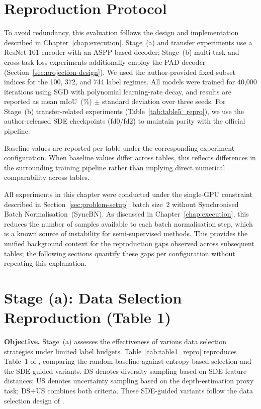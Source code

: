 \section{Reproduction Protocol}
\label{sec:repro_protocol}

\noindent
To avoid redundancy, this evaluation follows the design and implementation
described in Chapter~\ref{chap:execution}. Stage~(a) and transfer
experiments use a ResNet-101 encoder with an ASPP-based decoder;
Stage~(b) multi-task and cross-task loss experiments additionally employ
the PAD decoder (Section~\ref{sec:projection-design}). We used the
author-provided fixed subset indices for the 100, 372, and 744 label
regimes. All models were trained for 40,000 iterations using SGD with
polynomial learning-rate decay, and results are reported as mean
mIoU~(\%) $\pm$ standard deviation over three seeds. For Stage~(b)
transfer-related experiments (Table~\ref{tab:table5_repro}), we use the
author-released SDE checkpoints (fd0/fd2) to maintain parity with the
official pipeline.

Baseline values are reported per table under the corresponding experiment
configuration. When baseline values differ across tables, this reflects
differences in the surrounding training pipeline rather than implying
direct numerical comparability across tables.

All experiments in this chapter were conducted under the single-GPU
constraint described in Section~\ref{sec:problem-setup}: batch size~2
without Synchronised Batch Normalisation~(SyncBN). As discussed in
Chapter~\ref{chap:execution}, this reduces the number of samples
available to each batch normalisation step, which is a known source of
instability for semi-supervised methods. This provides the unified
background context for the reproduction gaps observed across subsequent
tables; the following sections quantify these gaps per configuration
without repeating this explanation.

\section{Stage (a): Data Selection Reproduction (Table 1)}
\label{sec:stage_a_table1}

\noindent
\textbf{Objective.} Stage~(a) assesses the effectiveness of various data
selection strategies under limited label budgets.
Table~\ref{tab:table1_repro} reproduces Table~1 of
\cite{hoyer2023improving}, comparing the random baseline against
entropy-based selection and the SDE-guided variants. DS denotes diversity
sampling based on SDE feature distances; US denotes uncertainty sampling
based on the depth-estimation proxy task; DS+US combines both criteria.
These SDE-guided variants follow the data selection design of
\cite{hoyer2023improving}.

